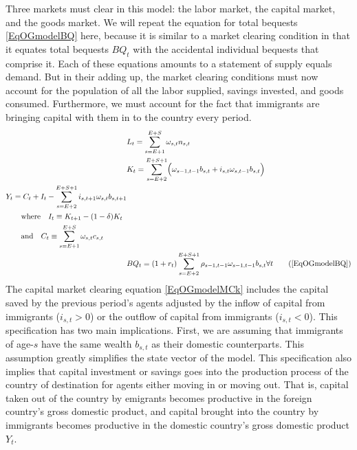 \documentclass[letterpaper,12pt]{article}
\theoremstyle{definition}
\begin{document}
    Three markets must clear in this model: the labor market, the capital market, and the goods market. We will repeat the equation for total bequests \eqref{EqOGmodelBQ} here, because it is similar to a market clearing condition in that it equates total bequests $BQ_t$ with the accidental individual bequests that comprise it. Each of these equations amounts to a statement of supply equals demand. But in their adding up, the market clearing conditions must now account for the population of all the labor supplied, savings invested, and goods consumed. Furthermore, we must account for the fact that immigrants are bringing capital with them in to the country every period.
    \begin{align}
      &L_t = \sum_{s=E+1}^{E+S} \omega_{s,t}n_{s,t} \label{EqOGmodelMCn} \\
      &K_t = \sum_{s=E+2}^{E+S+1}\Bigl(\omega_{s-1,t-1} b_{s,t} + i_{s,t}\omega_{s,t-1}b_{s,t}\Bigr) \label{EqOGmodelMCk} \\
      \begin{split}
        & Y_t = C_t + I_t - \sum_{s=E+2}^{E+S+1}i_{s,t+1}\omega_{s,t}b_{s,t+1}\\
        &\qquad\text{where}\quad I_t \equiv K_{t+1} - (1-\delta)K_t \\
        &\qquad\text{and}\quad C_t \equiv \sum_{s=E+1}^{E+S}\omega_{s,t}c_{s,t}
      \end{split} \label{EqOGmodelMCy} \\
      & BQ_t = (1 + r_t)\sum_{s = E+2}^{E+S+1}\rho_{s-1,t-1}\omega_{s-1,t-1}b_{s,t} \forall t \tag{\ref{EqOGmodelBQ}}
    \end{align}
    The capital market clearing equation \eqref{EqOGmodelMCk} includes the capital saved by the previous period's agents adjusted by the inflow of capital from immigrants ($i_{s,t}>0$) or the outflow of capital from immigrants ($i_{s,t}<0$). This specification has two main implications. First, we are assuming that immigrants of age-$s$ have the same wealth $b_{s,t}$ as their domestic counterparts. This assumption greatly simplifies the state vector of the model. This specification also implies that capital investment or savings goes into the production process of the country of destination for agents either moving in or moving out. That is, capital taken out of the country by emigrants becomes productive in the foreign country's gross domestic product, and capital brought into the country by immigrants becomes productive in the domestic country's gross domestic product $Y_t$.
\end{document}

